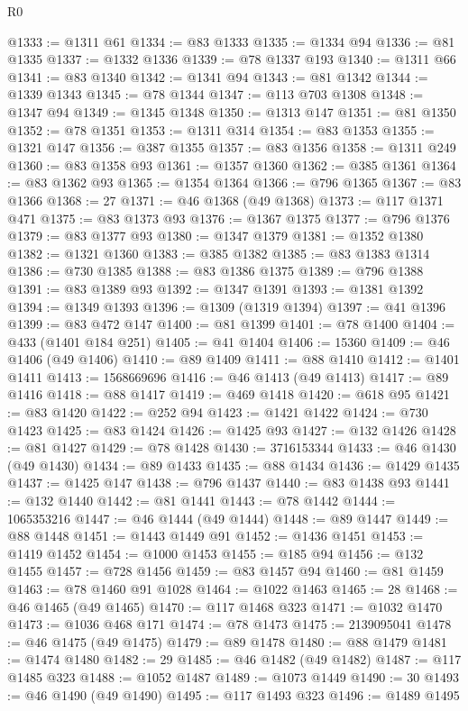 \begin{lexlean}{R0}
\begin{coremodule}
@1333 := @1311 @61
@1334 := @83 @1333
@1335 := @1334 @94
@1336 := @81 @1335
@1337 := @1332 @1336
@1339 := @78 @1337 @193
@1340 := @1311 @66
@1341 := @83 @1340
@1342 := @1341 @94
@1343 := @81 @1342
@1344 := @1339 @1343
@1345 := @78 @1344
@1347 := @113 @703 @1308
@1348 := @1347 @94
@1349 := @1345 @1348
@1350 := @1313 @147
@1351 := @81 @1350
@1352 := @78 @1351
@1353 := @1311 @314
@1354 := @83 @1353
@1355 := @1321 @147
@1356 := @387 @1355
@1357 := @83 @1356
@1358 := @1311 @249
@1360 := @83 @1358 @93
@1361 := @1357 @1360
@1362 := @385 @1361
@1364 := @83 @1362 @93
@1365 := @1354 @1364
@1366 := @796 @1365
@1367 := @83 @1366
@1368 := 27
@1371 := @46 @1368 (@49 @1368)
@1373 := @117 @1371 @471
@1375 := @83 @1373 @93
@1376 := @1367 @1375
@1377 := @796 @1376
@1379 := @83 @1377 @93
@1380 := @1347 @1379
@1381 := @1352 @1380
@1382 := @1321 @1360
@1383 := @385 @1382
@1385 := @83 @1383 @1314
@1386 := @730 @1385
@1388 := @83 @1386 @1375
@1389 := @796 @1388
@1391 := @83 @1389 @93
@1392 := @1347 @1391
@1393 := @1381 @1392
@1394 := @1349 @1393
@1396 := @1309 (@1319 @1394)
@1397 := @41 @1396
@1399 := @83 @472 @147
@1400 := @81 @1399
@1401 := @78 @1400
@1404 := @433 (@1401 @184 @251)
@1405 := @41 @1404
@1406 := 15360
@1409 := @46 @1406 (@49 @1406)
@1410 := @89 @1409
@1411 := @88 @1410
@1412 := @1401 @1411
@1413 := 1568669696
@1416 := @46 @1413 (@49 @1413)
@1417 := @89 @1416
@1418 := @88 @1417
@1419 := @469 @1418
@1420 := @618 @95
@1421 := @83 @1420
@1422 := @252 @94
@1423 := @1421 @1422
@1424 := @730 @1423
@1425 := @83 @1424
@1426 := @1425 @93
@1427 := @132 @1426
@1428 := @81 @1427
@1429 := @78 @1428
@1430 := 3716153344
@1433 := @46 @1430 (@49 @1430)
@1434 := @89 @1433
@1435 := @88 @1434
@1436 := @1429 @1435
@1437 := @1425 @147
@1438 := @796 @1437
@1440 := @83 @1438 @93
@1441 := @132 @1440
@1442 := @81 @1441
@1443 := @78 @1442
@1444 := 1065353216
@1447 := @46 @1444 (@49 @1444)
@1448 := @89 @1447
@1449 := @88 @1448
@1451 := @1443 @1449 @91
@1452 := @1436 @1451
@1453 := @1419 @1452
@1454 := @1000 @1453
@1455 := @185 @94
@1456 := @132 @1455
@1457 := @728 @1456
@1459 := @83 @1457 @94
@1460 := @81 @1459
@1463 := @78 @1460 @91 @1028
@1464 := @1022 @1463
@1465 := 28
@1468 := @46 @1465 (@49 @1465)
@1470 := @117 @1468 @323
@1471 := @1032 @1470
@1473 := @1036 @468 @171
@1474 := @78 @1473
@1475 := 2139095041
@1478 := @46 @1475 (@49 @1475)
@1479 := @89 @1478
@1480 := @88 @1479
@1481 := @1474 @1480
@1482 := 29
@1485 := @46 @1482 (@49 @1482)
@1487 := @117 @1485 @323
@1488 := @1052 @1487
@1489 := @1073 @1449
@1490 := 30
@1493 := @46 @1490 (@49 @1490)
@1495 := @117 @1493 @323
@1496 := @1489 @1495

\end{coremodule}
\end{lexlean}
